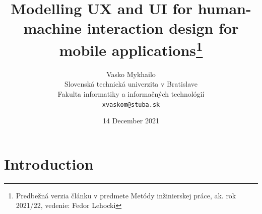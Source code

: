 \documentclass[10pt,twoside,english,a4paper]{article}
\title{Modelling UX and UI for human-machine interaction design for mobile applications\thanks{Predbežná verzia článku v predmete Metódy inžinierskej práce, ak. rok 2021/22, vedenie: Fedor Lehocki}} %
\author{Vasko Mykhailo\\[2pt]
	{\small Slovenská technická univerzita v Bratislave}\\
	{\small Fakulta informatiky a informačných technológií}\\
	{\small \texttt{xvaskom@stuba.sk}}
	}
\date{\small 14 December 2021} %
\begin{document}
\maketitle

%
%
%
%
%
%
%



\section{Introduction}
\end{document}
